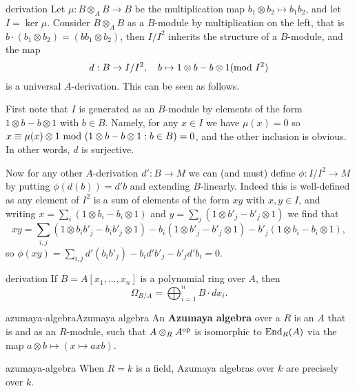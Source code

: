 \begin{example}{derivation}
    Let $\mu : B \otimes_A B \to B$ be the multiplication map $b_1 \otimes b_2 \mapsto b_1 b_2$, and let $I = \ker \mu$. Consider $B \otimes_A B$ as a $B$-module by multiplication on the left, that is $b \cdot (b_1 \otimes b_2) = (bb_1 \otimes b_2)$, then $I/I^2$ inherits the structure of a $B$-module, and the map
    \[ d : B \to I/I^2, \quad b \mapsto 1 \otimes b - b \otimes 1 (\textup{mod } I^2) \]
    is a universal $A$-derivation. This can be seen as follows.
    
    First note that $I$ is generated as an $B$-module by elements of the form $1 \otimes b - b \otimes 1$ with $b \in B$. Namely, for any $x \in I$ we have $\mu(x) = 0$ so $x \equiv \mu(x) \otimes 1 \textup{ mod } (1 \otimes b - b \otimes 1 : b \in B) = 0$, and the other inclusion is obvious. In other words, $d$ is surjective.
    
    Now for any other $A$-derivation $d' : B \to M$ we can (and must) define $\phi : I/I^2 \to M$ by putting $\phi(d(b)) = d' b$ and extending $B$-linearly. Indeed this is well-defined as any element of $I^2$ is a sum of elements of the form $xy$ with $x, y \in I$, and writing $x = \sum_i (1 \otimes b_i - b_i \otimes 1)$ and $y = \sum_j (1 \otimes b'_j - b'_j \otimes 1)$ we find that
    \[ xy = \sum_{i,j} (1 \otimes b_i b'_j - b_i b'_j \otimes 1) - b_i (1 \otimes b'_j - b'_j \otimes 1) - b'_j (1 \otimes b_i - b_i \otimes 1) , \]
    so $\phi(xy) = \sum_{i, j} d'(b_i b'_j) - b_i d' b'_j - b'_j d' b_i = 0$.
\end{example}

\begin{example}{derivation}
    If $B = A[x_1, \ldots, x_n]$ is a polynomial ring over $A$, then
    \[ \Omega_{B/A} = \bigoplus_{i = 1}^{n} B \cdot dx_i . \]
\end{example}

\begin{topic}{azumaya-algebra}{Azumaya algebra}
    An \textbf{Azumaya algebra} over a  $R$ is an  $A$ that is   and  as an $R$-module, such that $A \otimes_R A^\textup{op}$ is isomorphic to $\textup{End}_R(A)$ via the map $a \otimes b \mapsto (x \mapsto axb)$.
\end{topic}

\begin{example}{azumaya-algebra}
    When $R = k$ is a field, Azumaya algebras over $k$ are precisely  over $k$.
\end{example}

